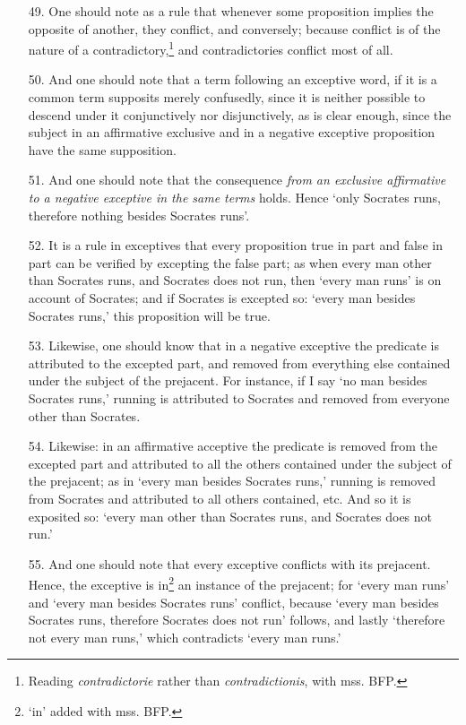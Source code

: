 \documentclass[]{article}
\begin{document}
\begin{itemize}
\item[49.] One should note as a rule that whenever some proposition implies the opposite of another, they conflict, and conversely; because conflict is of the nature of a contradictory,\footnote{Reading \textit{contradictorie} rather than \textit{contradictionis}, with mss. BFP.} and contradictories conflict most of all.
\item[50.] And one should note that a term following an exceptive word, if it is a common term supposits merely confusedly, since it is neither possible to descend under it conjunctively nor disjunctively, as is clear enough, since the subject in an affirmative exclusive and in a negative exceptive proposition have the same supposition.
\item[51.] And one should note that the consequence \textit{from an exclusive affirmative to a negative exceptive in the same terms} holds. Hence `only Socrates runs, therefore nothing besides Socrates runs'.
\item[52.] It is a rule in exceptives that every proposition true in part and false in part can be verified by excepting the false part; as when every man other than Socrates runs, and Socrates does not run, then `every man runs' is on account of Socrates; and if Socrates is excepted so: `every man besides Socrates runs,' this proposition will be true.
\item[53.] Likewise, one should know that in a negative exceptive the predicate is attributed to the excepted part, and removed from everything else contained under the subject of the prejacent. For instance, if I say `no man besides Socrates runs,' running is attributed to Socrates and removed from everyone other than Socrates.
\item[54.] Likewise: in an affirmative acceptive the predicate is removed from the excepted part and attributed to all the others contained under the subject of the prejacent; as in `every man besides Socrates runs,' running is removed from Socrates and attributed to all others contained, etc. And so it is exposited so: `every man other than Socrates runs, and Socrates does not run.'
\item[55.] And one should note that every exceptive conflicts with its prejacent. Hence, the exceptive is in\footnote{`in' added with mss. BFP.} an instance of the prejacent; for `every man runs' and `every man besides Socrates runs' conflict, because `every man besides Socrates runs, therefore Socrates does not run' follows, and lastly `therefore not every man runs,' which contradicts `every man runs.'

\end{itemize}
\end{document}
